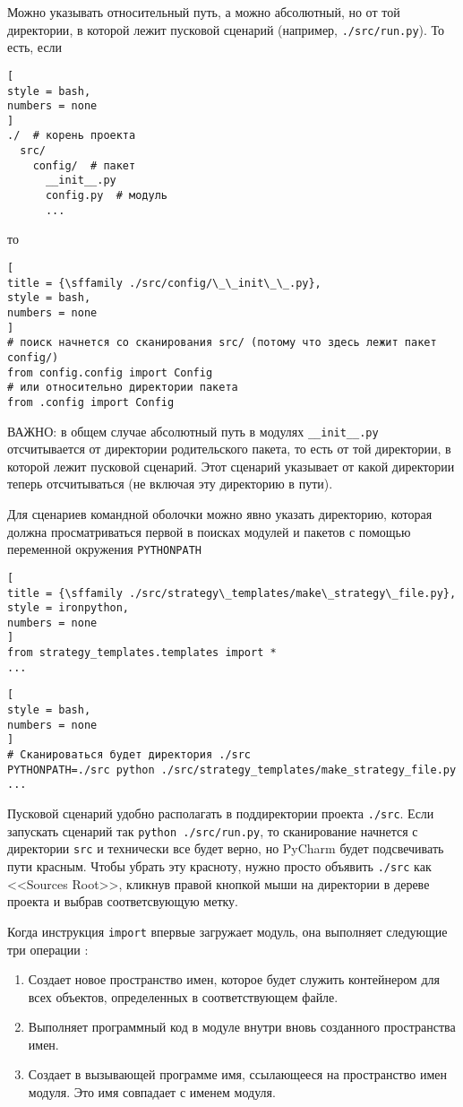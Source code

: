 \documentclass[%
	11pt,
	a4paper,
	utf8,
		]{article}
\begin{document}
Можно указывать относительный путь, а можно абсолютный, но от той {директории}, в которой лежит пусковой сценарий (например, \verb|./src/run.py|). То есть, если
\begin{lstlisting}[
style = bash,
numbers = none
]
./  # корень проекта
  src/
    config/  # пакет
      __init__.py
      config.py  # модуль
      ...
\end{lstlisting}
то
\begin{lstlisting}[
title = {\sffamily ./src/config/\_\_init\_\_.py},
style = bash,
numbers = none
]
# поиск начнется со сканирования src/ (потому что здесь лежит пакет config/)
from config.config import Config
# или относительно директории пакета
from .config import Config
\end{lstlisting}

ВАЖНО: в общем случае абсолютный путь в модулях \verb|__init__.py| отсчитывается от директории родительского пакета, то есть от той директории, в которой лежит пусковой сценарий. Этот сценарий указывает от какой директории теперь отсчитываться (не включая эту директорию в пути).

Для сценариев командной оболочки можно явно указать директорию, которая должна просматриваться первой в поисках модулей и пакетов с помощью переменной окружения \verb*|PYTHONPATH|
\begin{lstlisting}[
title = {\sffamily ./src/strategy\_templates/make\_strategy\_file.py},
style = ironpython,
numbers = none
]
from strategy_templates.templates import *
...
\end{lstlisting}

\begin{lstlisting}[
style = bash,
numbers = none
]
# Сканироваться будет директория ./src
PYTHONPATH=./src python ./src/strategy_templates/make_strategy_file.py ...
\end{lstlisting}

Пусковой сценарий удобно располагать в поддиректории проекта \verb|./src|. Если запускать сценарий так \verb|python ./src/run.py|, то сканирование начнется с директории \verb|src| и технически все будет верно, но PyCharm будет подсвечивать пути красным. Чтобы убрать эту красноту, нужно просто объявить \verb|./src| как <<Sources Root>>, кликнув правой кнопкой мыши на директории в дереве проекта и выбрав соответсвующую метку.

Когда инструкция \texttt{import} впервые загружает модуль, она выполняет следующие три операции \cite[]{beazley:python-2010}:
\begin{enumerate}
	\item Создает новое пространство имен, которое будет служить контейнером для всех объектов, определенных в соответствующем файле.
	
	\item Выполняет программный код в модуле внутри вновь созданного пространства имен.
	
	\item Создает в вызывающей программе имя, ссылающееся на пространство имен модуля. Это имя совпадает с именем модуля.
\end{enumerate}
\end{document}
